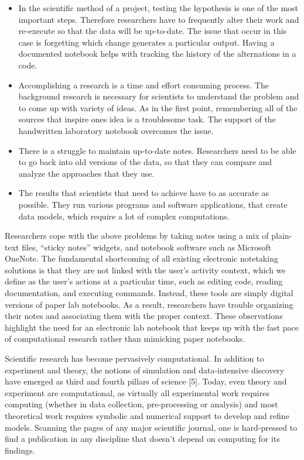 \begin{itemize}
\item In the scientific method of a project, testing the hypothesis is one of the most important steps. Therefore researchers have to frequently alter their work and re-execute so that the data will be up-to-date. The issue that occur in this case is forgetting which change generates a particular output. Having a documented notebook helps with tracking the history of the alternations in a code.

\item Accomplishing a research is a time and effort consuming process. The background research is necessary for scientists to understand the problem and to come up with variety of ideas. As in the first point, remembering all of the sources that inspire ones idea is a troublesome task. The support of the handwritten laboratory notebook overcomes the issue.

\item There is a struggle to maintain up-to-date notes. Researchers need to be able to go back into old versions of the data, so that they can compare and analyze the approaches that they use. 

\item The results that scientists that need to achieve have to as accurate as possible. They run various programs and software applications, that create data models, which require a lot of complex computations.

\end{itemize}


Researchers cope with the above problems by taking
notes using a mix of plain-text files, “sticky notes” widgets,
and notebook software such as Microsoft OneNote.
The fundamental shortcoming of all existing electronic
notetaking solutions is that they are not linked with the
user’s activity context, which we define as the user’s actions
at a particular time, such as editing code, reading
documentation, and executing commands. Instead,
these tools are simply digital versions of paper lab notebooks.
As a result, researchers have trouble organizing
their notes and associating them with the proper context.
These observations highlight the need for an electronic
lab notebook that keeps up with the fast pace of computational
research rather than mimicking paper notebooks.

Scientific research has become pervasively computational. In addition to experiment and theory, the notions of simulation and data-intensive discovery have emerged as third and fourth pillars of science [5]. Today, even theory and experiment are computational, as virtually all experimental work requires computing (whether in data collection, pre-processing or analysis) and most theoretical work requires symbolic and numerical support to develop and refine models. Scanning the pages of any major scientific journal, one is hard-pressed to find a publication in any discipline that doesn't depend on computing for its findings.

